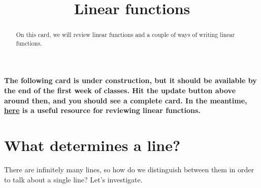 \documentclass{ximera}
\title[Dig-In:]{Linear functions}
\begin{document}
\begin{abstract}
On this card, we will review linear functions and a couple of ways of writing linear functions. 
\end{abstract}
\maketitle

\textbf{The following card is under construction, but it should be available by the end of the first week of classes.  Hit the update button above around then, and you should see a complete card.  In the meantime, \href{http://tutorial.math.lamar.edu/Classes/Alg/Lines.aspx}{here} is a useful resource for reviewing linear functions.}

\section{What determines a line?}

There are infinitely many lines, so how do we distinguish between them in order to talk about a single line?  Let's investigate. 
\end{document}
